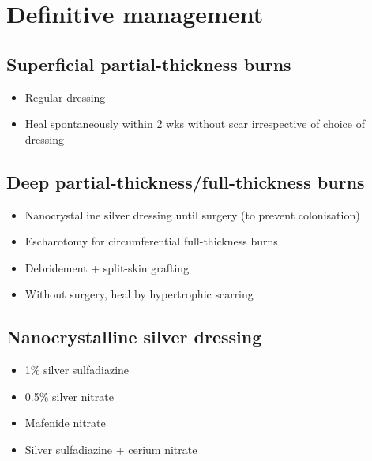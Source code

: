 \documentclass[
  12pt,
]{memoir}
\providecommand{\tightlist}{%
  \setlength{\itemsep}{0pt}\setlength{\parskip}{0pt}}
\begin{document}
\hypertarget{definitive-management}{%
\section{Definitive management}\label{definitive-management}}

\hypertarget{superficial-partial-thickness-burns}{%
\subsection{Superficial partial-thickness
burns}\label{superficial-partial-thickness-burns}}

\begin{itemize}
\tightlist
\item
  Regular dressing
\item
  Heal spontaneously within 2 wks without scar irrespective of choice of
  dressing
\end{itemize}

\hypertarget{deep-partial-thicknessfull-thickness-burns}{%
\subsection{Deep partial-thickness/full-thickness
burns}\label{deep-partial-thicknessfull-thickness-burns}}

\begin{itemize}
\tightlist
\item
  Nanocrystalline silver dressing until surgery (to prevent
  colonisation)
\item
  Escharotomy for circumferential full-thickness burns
\item
  Debridement + split-skin grafting
\item
  Without surgery, heal by hypertrophic scarring
\end{itemize}

\hypertarget{nanocrystalline-silver-dressing}{%
\subsection{Nanocrystalline silver
dressing}\label{nanocrystalline-silver-dressing}}

\begin{itemize}
\tightlist
\item
  1\% silver sulfadiazine
\item
  0.5\% silver nitrate
\item
  Mafenide nitrate
\item
  Silver sulfadiazine + cerium nitrate
\end{itemize}
\end{document}

